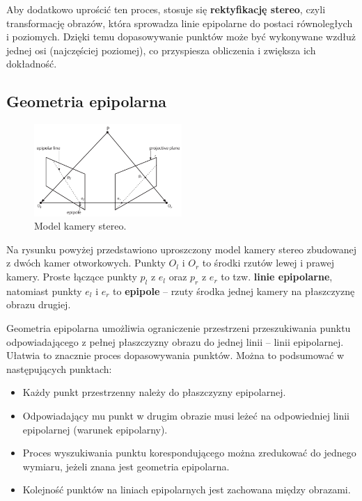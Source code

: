 \documentclass[magisterska]{pracadypl}
\begin{document}
Aby dodatkowo uprościć ten proces, stosuje się \textbf{rektyfikację stereo}, czyli transformację obrazów, która sprowadza linie epipolarne do postaci równoległych i poziomych. Dzięki temu dopasowywanie punktów może być wykonywane wzdłuż jednej osi (najczęściej poziomej), co przyspiesza obliczenia i zwiększa ich dokładność.

\subsection{Geometria epipolarna}

\begin{figure}[H]
    \centering
    \includegraphics[width=0.5\textwidth]{images/epipolar.png}
    \captionsetup{font=footnotesize}
    \caption[Model kamery stereo. Learning OpenCV 3, O'Reilly, Str. 709]{Model kamery stereo.}
    \label{fig:rpi}
\end{figure}

Na rysunku powyżej przedstawiono uproszczony model kamery stereo zbudowanej z dwóch kamer otworkowych. Punkty $O_l$ i $O_r$ to środki rzutów lewej i prawej kamery. Proste łączące punkty $p_l$ z $e_l$ oraz $p_r$ z $e_r$ to tzw. \textbf{linie epipolarne}, natomiast punkty $e_l$ i $e_r$ to \textbf{epipole} – rzuty środka jednej kamery na płaszczyznę obrazu drugiej.

Geometria epipolarna umożliwia ograniczenie przestrzeni przeszukiwania punktu odpowiadającego z pełnej płaszczyzny obrazu do jednej linii – linii epipolarnej. Ułatwia to znacznie proces dopasowywania punktów. Można to podsumować w następujących punktach:

\begin{itemize}
    \item Każdy punkt przestrzenny należy do płaszczyzny epipolarnej.
    \item Odpowiadający mu punkt w drugim obrazie musi leżeć na odpowiedniej linii epipolarnej (warunek epipolarny).
    \item Proces wyszukiwania punktu korespondującego można zredukować do jednego wymiaru, jeżeli znana jest geometria epipolarna.
    \item Kolejność punktów na liniach epipolarnych jest zachowana między obrazami.
\end{itemize}
\end{document}
